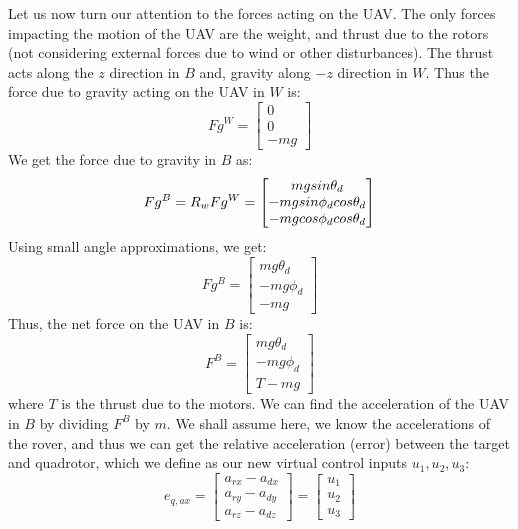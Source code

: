 \documentclass[conf]{new-aiaa}
\begin{document}
Let us now turn our attention to the forces acting on the UAV. The only forces impacting the motion of the UAV are the weight, and thrust due to the rotors (not considering external forces due to wind or other disturbances). The thrust acts along the $z$ direction in $B$ and, gravity along $-z$ direction in $W$.
Thus the force due to gravity acting on the UAV in $W$ is:
\begin{equation}
Fg^{W} = \begin{bmatrix}
0 \\ 0 \\ -mg
\end{bmatrix}
\end{equation}
We get the force due to gravity in $B$ as:
\begin{equation}
Fg^{B} = R_{w}Fg^{W}\\
	   = \begin{bmatrix}
		mgsin\theta_{d} \\ -mgsin\phi_{d}cos\theta_{d} \\ -mgcos\phi_{d}cos\theta_{d}
		\end{bmatrix}
\end{equation}
Using small angle approximations, we get:
\begin{equation}
Fg^{B}= \begin{bmatrix}
		mg\theta_{d} \\ -mg\phi_{d} \\ -mg
		\end{bmatrix}
\end{equation}
Thus, the net force on the UAV in $B$ is:
\begin{equation}
F^{B}= \begin{bmatrix}
		mg\theta_{d} \\ -mg\phi_{d} \\ T-mg
		\end{bmatrix}
\end{equation}
where $T$ is the thrust due to the motors. We can find the acceleration of the UAV in $B$ by dividing $F^{B}$ by $m$. We shall assume here, we know the accelerations of the rover, and thus we can get the relative acceleration (error) between the target and quadrotor, which we define as our new virtual control inputs $u_{1}, u_{2}, u_{3}$:
\begin{equation}
e_{q, ax} = \begin{bmatrix}
a_{rx}-a_{dx} \\ a_{ry}-a_{dy} \\ a_{rz}-a_{dz}
\end{bmatrix} = \begin{bmatrix}
u_{1}\\
u_{2}\\
u_{3}
\end{bmatrix}
\end{equation}
\end{document}
